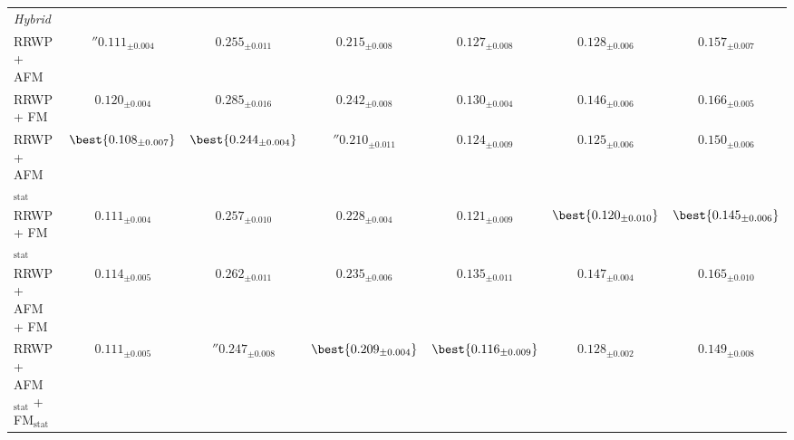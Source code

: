 \begin{table}
{\begin{tabular}{l c c c c c c}
\midrule
\multicolumn{7}{l}{\textit{Hybrid}} \\
  RRWP + AFM & $\second{0.111}{_{\pm 0.004}}$ & $0.255{_{\pm 0.011}}$ & $0.215{_{\pm 0.008}}$ & $0.127{_{\pm 0.008}}$ & $0.128{_{\pm 0.006}}$ & $0.157{_{\pm 0.007}}$ \\
  RRWP + FM & $0.120{_{\pm 0.004}}$ & $0.285{_{\pm 0.016}}$ & $0.242{_{\pm 0.008}}$ & $0.130{_{\pm 0.004}}$ & $0.146{_{\pm 0.006}}$ & $0.166{_{\pm 0.005}}$ \\
  RRWP + AFM$_{\text{stat}}$ & $\best{0.108{_{\pm 0.007}}}$ & $\best{0.244{_{\pm 0.004}}}$ & $\second{0.210}{_{\pm 0.011}}$ & $0.124{_{\pm 0.009}}$ & $0.125{_{\pm 0.006}}$ & $0.150{_{\pm 0.006}}$ \\
  RRWP + FM$_{\text{stat}}$ & $0.111{_{\pm 0.004}}$ & $0.257{_{\pm 0.010}}$ & $0.228{_{\pm 0.004}}$ & $0.121{_{\pm 0.009}}$ & $\best{0.120{_{\pm 0.010}}}$ & $\best{0.145{_{\pm 0.006}}}$ \\
  RRWP + AFM + FM & $0.114{_{\pm 0.005}}$ & $0.262{_{\pm 0.011}}$ & $0.235{_{\pm 0.006}}$ & $0.135{_{\pm 0.011}}$ & $0.147{_{\pm 0.004}}$ & $0.165{_{\pm 0.010}}$ \\
  RRWP + AFM$_{\text{stat}}$ + FM$_{\text{stat}}$ & $0.111{_{\pm 0.005}}$ & $\second{0.247}{_{\pm 0.008}}$ & $\best{0.209{_{\pm 0.004}}}$ & $\best{0.116{_{\pm 0.009}}}$ & $0.128{_{\pm 0.002}}$ & $0.149{_{\pm 0.008}}$ \\
\bottomrule
\end{tabular}
}
\end{table}
